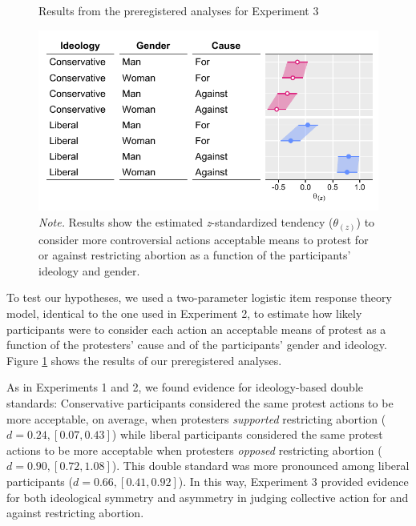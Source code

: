 \documentclass[12pt, letterpaper]{article}
\begin{document}
\begin{figure}[!t]
\centering
\caption{Results from the preregistered analyses for Experiment 3}
\includegraphics[scale=1]{../Experiment 3/figures/figure-6}
\caption*{\textit{Note.} Results show the estimated \textit{z}-standardized tendency ($\theta_{(z)}$) to consider more controversial actions acceptable means to protest for or against restricting abortion as a function of the participants' ideology and gender.}
\label{fig:f6}
\end{figure}

To test our hypotheses, we used a two-parameter logistic item response
theory model, identical to the one used in Experiment 2, to estimate how
likely participants were to consider each action an acceptable means of
protest as a function of the protesters' cause and of the participants'
gender and ideology. Figure \ref{fig:f6} shows the results of our
preregistered analyses.

As in Experiments 1 and 2, we found evidence for ideology-based double
standards: Conservative participants considered the same protest actions
to be more acceptable, on average, when protesters \emph{supported}
restricting abortion (\(d = 0.24, [0.07, 0.43]\)) while liberal
participants considered the same protest actions to be more acceptable
when protesters \emph{opposed} restricting abortion
(\(d = 0.90, [0.72, 1.08]\)). This double standard was more pronounced
among liberal participants (\(d = 0.66, [0.41, 0.92]\)). In this way,
Experiment 3 provided evidence for both ideological symmetry and
asymmetry in judging collective action for and against restricting
abortion.
\end{document}
